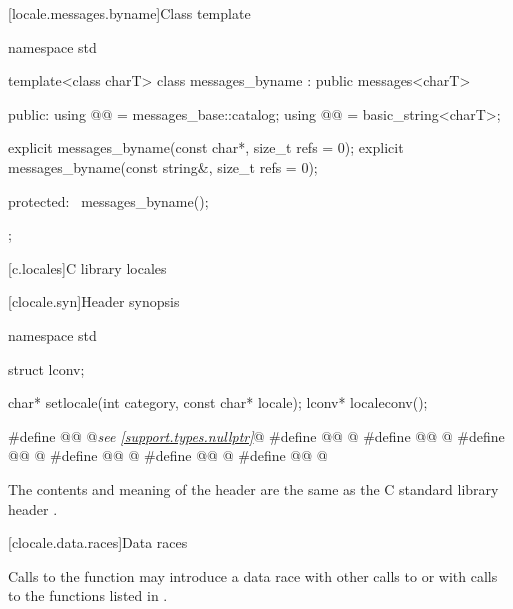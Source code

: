 [locale.messages.byname]{Class template }

%
\begin{codeblock}
namespace std {
  template<class charT>
  class messages_byname : public messages<charT> {
  public:
    using @@     = messages_base::catalog;
    using @@ = basic_string<charT>;

    explicit messages_byname(const char*, size_t refs = 0);
    explicit messages_byname(const string&, size_t refs = 0);

  protected:
    ~messages_byname();
  };
}
\end{codeblock}

[c.locales]{C library locales}

[clocale.syn]{Header  synopsis}

%
%
%
\begin{codeblock}
namespace std {
  struct lconv;

  char* setlocale(int category, const char* locale);
  lconv* localeconv();
}

#define @@ @\textit{see \ref{support.types.nullptr}}@
#define @@ @\seebelow@
#define @@ @\seebelow@
#define @@ @\seebelow@
#define @@ @\seebelow@
#define @@ @\seebelow@
#define @@ @\seebelow@
\end{codeblock}

\pnum
The contents and meaning of the header 
are the same as the C standard library header .

[clocale.data.races]{Data races}

\pnum
Calls to the function 
may introduce a data race
with other calls to  or
with calls to the functions listed in .


